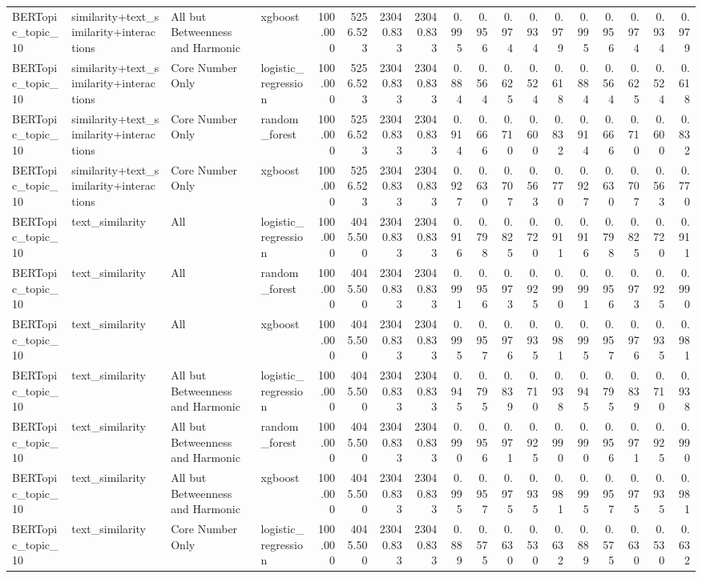 \begin{tabular}{llllrrrrrrrrrrrrrr}
BERTopic\_topic\_10 & similarity+text\_similarity+interactions & All but Betweenness and Harmonic & xgboost & 100.000 & 5256.523 & 23040.833 & 23040.833 & 0.995 & 0.956 & 0.974 & 0.934 & 0.979 & 0.995 & 0.956 & 0.974 & 0.934 & 0.979 \\
BERTopic\_topic\_10 & similarity+text\_similarity+interactions & Core Number Only & logistic\_regression & 100.000 & 5256.523 & 23040.833 & 23040.833 & 0.884 & 0.564 & 0.625 & 0.524 & 0.618 & 0.884 & 0.564 & 0.625 & 0.524 & 0.618 \\
BERTopic\_topic\_10 & similarity+text\_similarity+interactions & Core Number Only & random\_forest & 100.000 & 5256.523 & 23040.833 & 23040.833 & 0.914 & 0.666 & 0.710 & 0.600 & 0.832 & 0.914 & 0.666 & 0.710 & 0.600 & 0.832 \\
BERTopic\_topic\_10 & similarity+text\_similarity+interactions & Core Number Only & xgboost & 100.000 & 5256.523 & 23040.833 & 23040.833 & 0.927 & 0.630 & 0.707 & 0.563 & 0.770 & 0.927 & 0.630 & 0.707 & 0.563 & 0.770 \\
BERTopic\_topic\_10 & text\_similarity & All & logistic\_regression & 100.000 & 4045.500 & 23040.833 & 23040.833 & 0.916 & 0.798 & 0.825 & 0.720 & 0.911 & 0.916 & 0.798 & 0.825 & 0.720 & 0.911 \\
BERTopic\_topic\_10 & text\_similarity & All & random\_forest & 100.000 & 4045.500 & 23040.833 & 23040.833 & 0.991 & 0.956 & 0.973 & 0.925 & 0.990 & 0.991 & 0.956 & 0.973 & 0.925 & 0.990 \\
BERTopic\_topic\_10 & text\_similarity & All & xgboost & 100.000 & 4045.500 & 23040.833 & 23040.833 & 0.995 & 0.957 & 0.976 & 0.935 & 0.981 & 0.995 & 0.957 & 0.976 & 0.935 & 0.981 \\
BERTopic\_topic\_10 & text\_similarity & All but Betweenness and Harmonic & logistic\_regression & 100.000 & 4045.500 & 23040.833 & 23040.833 & 0.945 & 0.795 & 0.839 & 0.710 & 0.938 & 0.945 & 0.795 & 0.839 & 0.710 & 0.938 \\
BERTopic\_topic\_10 & text\_similarity & All but Betweenness and Harmonic & random\_forest & 100.000 & 4045.500 & 23040.833 & 23040.833 & 0.990 & 0.956 & 0.971 & 0.925 & 0.990 & 0.990 & 0.956 & 0.971 & 0.925 & 0.990 \\
BERTopic\_topic\_10 & text\_similarity & All but Betweenness and Harmonic & xgboost & 100.000 & 4045.500 & 23040.833 & 23040.833 & 0.995 & 0.957 & 0.975 & 0.935 & 0.981 & 0.995 & 0.957 & 0.975 & 0.935 & 0.981 \\
BERTopic\_topic\_10 & text\_similarity & Core Number Only & logistic\_regression & 100.000 & 4045.500 & 23040.833 & 23040.833 & 0.889 & 0.575 & 0.630 & 0.530 & 0.632 & 0.889 & 0.575 & 0.630 & 0.530 & 0.632 \\

\end{tabular}
